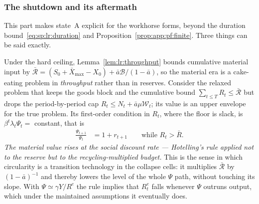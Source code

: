 \subsubsection{The shutdown and its aftermath}\label{sec:app:workhorse:shutdown}

This part makes state~A explicit for the workhorse forms, beyond the duration bound~\eqref{eq:sp:lr:duration} and Proposition~\ref{prop:app:pf:finite}. Three things can be said exactly.

 Under the hard ceiling, Lemma~\ref{lem:lr:throughput} bounds cumulative material input by $\bar{\mathcal R}=\left(S_0+\bar X_{\max}-X_0\right)+\bar a\mathcal B/\left(1-\bar a\right)$, so the material era is a cake-eating problem in \emph{throughput} rather than in reserves. Consider the relaxed problem that keeps the goods block and the cumulative bound $\sum_{t\le T}R_t\le\bar{\mathcal R}$ but drops the period-by-period cap $R_t\le N_t+\bar a\mu\mathcal W_t$; its value is an upper envelope for the true problem. Its first-order condition in $R_t$, where the floor is slack, is $\beta^t\lambda_t\Psi_t=$ constant, that is
\begin{align}
\frac{\Psi_{t+1}}{\Psi_t} &= 1+r_{t+1}
\qquad\text{while }R_t>\bar R .
\label{eq:app:wh:hotelling}
\end{align}
\emph{The material value rises at the social discount rate --- Hotelling's rule applied not to the reserve but to the recycling-multiplied budget.} This is the sense in which circularity is a transition technology in the collapse cells: it multiplies $\bar{\mathcal R}$ by $\left(1-\bar a\right)^{-1}$ and thereby lowers the level of the whole $\Psi$ path, without touching its slope. With $\Psi\simeq\gamma Y/R^{e}$ the rule implies that $R^{e}_t$ falls whenever $\Psi$ outruns output, which under the maintained assumptions it eventually does.

